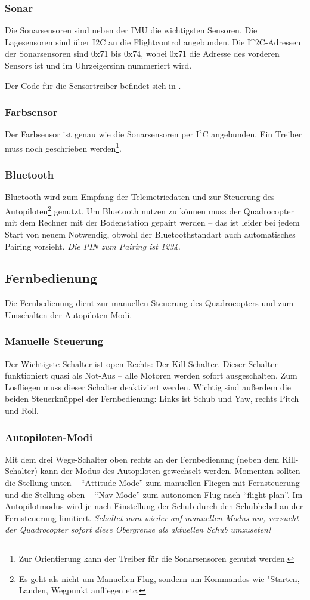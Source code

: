 \subsubsection{Sonar}
Die Sonarsensoren sind neben der IMU die wichtigsten Sensoren. Die Lagesensoren sind über I2C an die Flightcontrol angebunden.
Die I^$2$C-Adressen der Sonarsensoren sind 0x71 bis 0x74, wobei 0x71 die Adresse des vorderen Sensors ist und im Uhrzeigersinn nummeriert wird.

Der Code für die Sensortreiber befindet sich in .

\subsubsection{Farbsensor}
Der Farbsensor ist genau wie die Sonarsensoren per I$^2$C angebunden. Ein Treiber muss noch geschrieben werden\footnote{Zur Orientierung kann der Treiber für die Sonarsensoren genutzt werden.}.


\subsubsection{Bluetooth}
Bluetooth wird zum Empfang der Telemetriedaten und zur Steuerung des Autopiloten\footnote{Es geht als nicht um Manuellen Flug, sondern um Kommandos wie "Starten, Landen, Wegpunkt anfliegen etc.} genutzt.
Um Bluetooth nutzen zu können muss der Quadrocopter mit dem Rechner mit der Bodenstation gepairt werden – das ist leider bei jedem Start von neuem Notwendig, obwohl der Bluetoothstandart auch automatisches Pairing vorsieht.
\emph{Die PIN zum Pairing ist 1234.}


\subsection{Fernbedienung}
Die Fernbedienung dient zur manuellen Steuerung des Quadrocopters und zum Umschalten der Autopiloten-Modi.

\subsubsection{Manuelle Steuerung}
Der Wichtigste Schalter ist open Rechts: Der Kill-Schalter. Dieser Schalter funktioniert quasi als Not-Aus – alle Motoren werden sofort ausgeschalten.
Zum Losfliegen muss dieser Schalter deaktiviert werden.
Wichtig sind außerdem die beiden Steuerknüppel der Fernbedienung: Links ist Schub und Yaw, rechts Pitch und Roll.

\subsubsection{Autopiloten-Modi}
Mit dem drei Wege-Schalter oben rechts an der Fernbedienung (neben dem Kill-Schalter) kann der Modus des Autopiloten gewechselt werden.
Momentan sollten die Stellung unten – \enquote{Attitude Mode} zum manuellen Fliegen mit Fernsteuerung und die Stellung oben – \enquote{Nav Mode} zum autonomen Flug nach \enquote{flight-plan}.
Im Autopilotmodus wird je nach Einstellung der Schub durch den Schubhebel an der Fernsteuerung limitiert. \emph{Schaltet man wieder auf manuellen Modus um, versucht der Quadrocopter sofort diese Obergrenze als aktuellen Schub umzuseten!}
